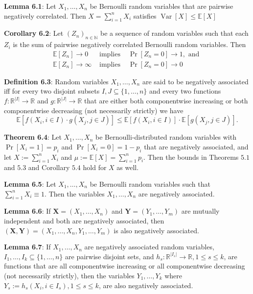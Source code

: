 \textbf{Lemma 6.1}: Let $X_{1}, \ldots, X_{n}$ be Bernoulli random variables that are pairwise negatively correlated. Then $X=\sum_{i=1}^{n} X_{i}$ satisfies
$\operatorname{Var}[X] \leq \mathbb{E}[X]$

\textbf{Corollary 6.2}: Let $\left(Z_{n}\right)_{n \in \mathbb{N}}$ be a sequence of random variables such that each $Z_{i}$ is the sum of pairwise negatively correlated Bernoulli random variables. Then
$$
\begin{array}{lll}
\mathbb{E}\left[Z_{n}\right] \rightarrow 0 & \text { implies } & \operatorname{Pr}\left[Z_{n}=0\right] \rightarrow 1, \text { and } \\
\mathbb{E}\left[Z_{n}\right] \rightarrow \infty & \text { implies } & \operatorname{Pr}\left[Z_{n}=0\right] \rightarrow 0
\end{array}
$$

\textbf{Definition 6.3}: Random variables $X_{1}, \ldots, X_{n}$ are said to be negatively associated iff for every two disjoint subsets $I, J \subseteq\{1, \ldots, n\}$ and every two functions $f: \mathbb{R}^{|I|} \rightarrow \mathbb{R}$ and $g: \mathbb{R}^{|J|} \rightarrow \mathbb{R}$ that are either both componentwise increasing or both componentwise decreasing (not necessarily strictly) we have
$$
\mathbb{E}\left[f\left(X_{i}, i \in I\right) \cdot g\left(X_{j}, j \in J\right)\right] \leq \mathbb{E}\left[f\left(X_{i}, i \in I\right)\right] \cdot \mathbb{E}\left[g\left(X_{j}, j \in J\right)\right] .
$$

\textbf{Theorem 6.4}: Let $X_{1}, \ldots, X_{n}$ be Bernoulli-distributed random variables with $\operatorname{Pr}\left[X_{i}=1\right]=p_{i}$ and $\operatorname{Pr}\left[X_{i}=0\right]=1-p_{i}$ that are negatively associated, and let $X:=\sum_{i=1}^{n} X_{i}$ and $\mu:=\mathbb{E}[X]=\sum_{i=1}^{n} p_{i}$. Then the bounds in Theorems $5.1$ and $5.3$ and Corollary $5.4$ hold for $X$ as well.

\textbf{Lemma 6.5}: Let $X_{1}, \ldots, X_{n}$ be Bernoulli random variables such that $\sum_{i=1}^{n} X_{i} \equiv 1$. Then the variables $X_{1}, \ldots, X_{n}$ are negatively associated.

\textbf{Lemma 6.6}: If $\mathbf{X}=\left(X_{1}, \ldots, X_{n}\right)$ and $\mathbf{Y}=\left(Y_{1}, \ldots, Y_{m}\right)$ are mutually independent and both are negatively associated, then $(\mathbf{X}, \mathbf{Y})=\left(X_{1}, \ldots, X_{n}, Y_{1}, \ldots, Y_{m}\right)$ is also negatively associated.

\textbf{Lemma 6.7}: If $X_{1}, \ldots, X_{n}$ are negatively associated random variables, $I_{1}, \ldots, I_{k} \subseteq\{1, \ldots, n\}$ are pairwise disjoint sets, and $h_{s}: \mathbb{R}^{\left|I_{s}\right|} \rightarrow \mathbb{R}, 1 \leq s \leq k$, are functions that are all componentwise increasing or all componentwise decreasing (not necessarily strictly), then the variables $Y_{1}, \ldots, Y_{k}$ where $Y_{s}:=h_{s}\left(X_{i}, i \in I_{s}\right), 1 \leq s \leq k$, are also negatively associated.